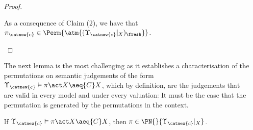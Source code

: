 \begin{proof}
\begin{enumerate}
        As a consequence of Claim (2), we have that $\pi_{\catnew{c}}\in \Perm{\atm{(\Upsilon_{\catnew{c}}|_X)_{\fresh}}}$.
     \end{enumerate}
\end{proof}

The next lemma is the most challenging as it establishes a characterisation of the permutations on semantic judgements of the form $\Upsilon_{\catnew{c}} \vDash \pi\act X\aeq{C} X$, which by definition, are the judgements that are valid in every model and under every valuation: It must be the case that the permutation is generated by the permutations in the context.

\begin{lemma}\label{alemma:valid-judge-pi-generated} \hfill

    If $\Upsilon_{\catnew{c}} \vDash \pi\act X\aeq{C} X$, then $\pi\in \PN{}{\Upsilon_{\catnew{c}}|_X}$.
\end{lemma}

